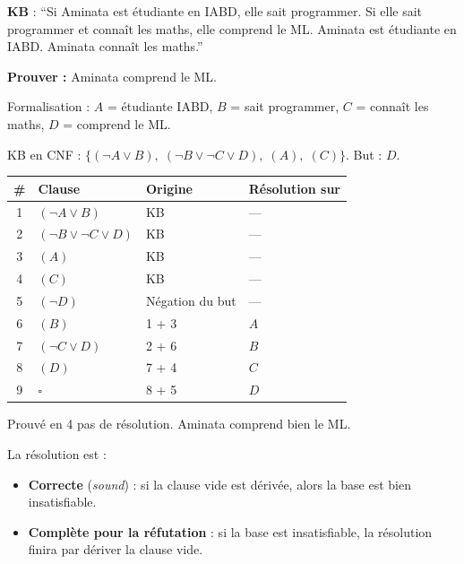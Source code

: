 \documentclass[11pt,a4paper]{article}
\newcommand{\cmark}{\ding{51}}
\begin{document}
\begin{exemplebox}
\textbf{KB} : ``Si Aminata est étudiante en IABD, elle sait programmer. Si elle sait programmer et connaît les maths, elle comprend le ML. Aminata est étudiante en IABD. Aminata connaît les maths.''

\textbf{Prouver :} Aminata comprend le ML.

Formalisation : $A$ = étudiante IABD, $B$ = sait programmer, $C$ = connaît les maths, $D$ = comprend le ML.

KB en CNF : $\{(\neg A \lor B), \; (\neg B \lor \neg C \lor D), \; (A), \; (C)\}$. But : $D$.

\begin{center}
\begin{tabular}{clll}
\toprule
\textbf{\#} & \textbf{Clause} & \textbf{Origine} & \textbf{Résolution sur} \\
\midrule
1 & $(\neg A \lor B)$ & KB & --- \\
2 & $(\neg B \lor \neg C \lor D)$ & KB & --- \\
3 & $(A)$ & KB & --- \\
4 & $(C)$ & KB & --- \\
5 & $(\neg D)$ & Négation du but & --- \\
\midrule
6 & $(B)$ & 1 + 3 & $A$ \\
7 & $(\neg C \lor D)$ & 2 + 6 & $B$ \\
8 & $(D)$ & 7 + 4 & $C$ \\
9 & $\square$ & 8 + 5 & $D$ \quad \cmark \\
\bottomrule
\end{tabular}
\end{center}

Prouvé en 4 pas de résolution. Aminata comprend bien le ML.
\end{exemplebox}

\begin{theorembox}
La résolution est :
\begin{itemize}[nosep]
    \item \textbf{Correcte} (\textit{sound}) : si la clause vide est dérivée, alors la base est bien insatisfiable.
    \item \textbf{Complète pour la réfutation} : si la base est insatisfiable, la résolution finira par dériver la clause vide.
\end{itemize}
\end{theorembox}
\end{document}
